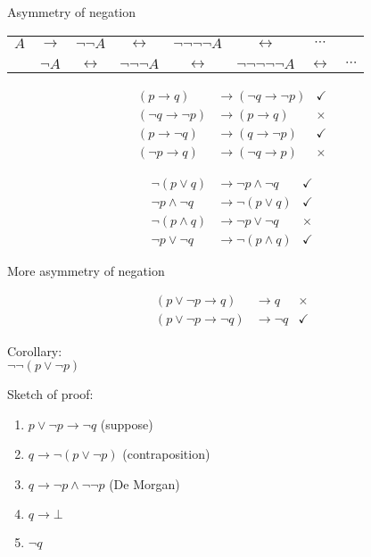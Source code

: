 \documentclass{beamer}
\begin{document}
\begin{frame}{Asymmetry of negation}

\addvspace{\baselineskip}
\begin{tabular}{cccccccc}
    $A$
    & $\to$ & $\lnot\lnot A$
    & $\leftrightarrow$ & $\lnot\lnot\lnot\lnot A$
    & $\leftrightarrow$ & $\dotsb$ \\
    \\
    & $\lnot A$
    & $\leftrightarrow$ & $\lnot\lnot\lnot A$
    & $\leftrightarrow$ & $\lnot\lnot\lnot\lnot\lnot A$
    & $\leftrightarrow$ & $\dotsb$
\end{tabular}

\vfill

\begin{minipage}{.45\textwidth}
\begin{align*}
(p\to q) &\to (\lnot q\to\lnot p) & \checkmark \\
(\lnot q\to\lnot p) &\to (p\to q) & \times \\
(p\to\lnot q) &\to (q\to\lnot p) & \checkmark \\
(\lnot p\to q) &\to (\lnot q\to p) & \times
\end{align*}
\end{minipage}
\hfill
\begin{minipage}{.45\textwidth}
\begin{align*}
\lnot (p\lor q) &\to \lnot p\land \lnot q & \checkmark \\
\lnot p\land \lnot q &\to \lnot (p\lor q) & \checkmark \\
\lnot (p\land q) &\to \lnot p\lor \lnot q & \times \\
\lnot p\lor\lnot q &\to \lnot (p\land q) & \checkmark
\end{align*}
\end{minipage}

\end{frame}

\begin{frame}{More asymmetry of negation}
\begin{minipage}{.30\textwidth}
\begin{align*}
    (p\lor\lnot p\to q)&\to q &\times \\
    (p\lor\lnot p\to\lnot q)&\to \lnot q &\checkmark
\end{align*}

Corollary:\\
$\lnot\lnot (p\lor\lnot p)$
\end{minipage}
\hfill
\begin{minipage}[c]{.55\textwidth}
Sketch of proof:
\begin{enumerate}
\item $p\lor\lnot p\to\lnot q$ (suppose)
\item $q\to\lnot(p\lor\lnot p)$
    (contraposition)
\item $q\to\lnot p\land\lnot\lnot p$
    (De Morgan)
\item $q\to\bot$
\item $\lnot q$
\end{enumerate}
\end{minipage}
\end{frame}
\end{document}
